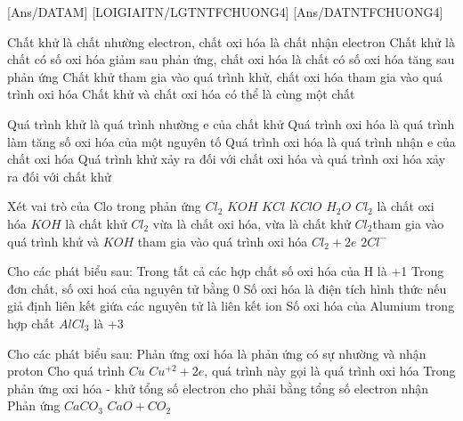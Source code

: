 [Ans/DATAM]
\luulgEXTF
{}[LOIGIAITN/LGTNTFCHUONG4]
[Ans/DATNTFCHUONG4]
\begin{ex}
	\choiceTF
	{\True Chất khử là chất nhường electron, chất oxi hóa là chất nhận electron}
	{Chất khử là chất có số oxi hóa giảm sau phản ứng, chất oxi hóa là chất có số oxi hóa tăng sau phản ứng}
	{Chất khử tham gia vào quá trình khử, chất oxi hóa tham gia vào quá trình oxi hóa}
	{\True Chất khử và chất oxi hóa có thể là cùng một chất}
	\loigiai{}
\end{ex}
\begin{ex}
	\choiceTF
	{Quá trình khử là quá trình nhường e của chất khử}
	{\True Quá trình  oxi hóa là quá trình làm tăng số oxi hóa của một nguyên tố}
	{Quá trình oxi hóa là quá trình nhận e của chất oxi hóa}
	{\True Quá trình khử xảy ra đối với chất oxi hóa và quá trình oxi hóa xảy ra đối với chất khử}
	\loigiai{}
\end{ex}
\begin{ex}Xét vai trò của Clo trong phản ứng $Cl_2$ \explus $KOH$ \MuiTen $KCl$ \explus $KClO$ \explus $H_2O$
	\choiceTF
	{ $Cl_2 $ là chất oxi hóa $KOH$ là chất khử}
	{\True $Cl_2$ vừa là chất oxi hóa, vừa là chất khử}
	{$Cl_2 $tham gia vào quá trình khử và $KOH$ tham gia vào quá trình oxi hóa}
	{\True $ Cl_2 + 2e$ \MuiTen[][][0.65]$2Cl^{-}$}
	\loigiai{}
\end{ex}
\begin{ex}
	Cho các phát biểu sau:
	\choiceTF
	{Trong tất cả các hợp chất số oxi hóa của H là +1}
	{\True Trong đơn chất, số oxi hoá của nguyên tử bằng 0}
	{\True Số oxi hóa là điện tích hình thức nếu giả định liên kết giứa các nguyên tử là liên kết ion}
	{\True Số oxi hóa của Alumium trong hợp chất $AlCl_3$ là +3}
	\loigiai{}
\end{ex}
\begin{ex}
	Cho các phát biểu sau:
	\choiceTF
	{Phản ứng oxi hóa là phản ứng có sự nhường và nhận proton}
	{\True Cho quá trình $Cu$ \MuiTen $Cu^{+2} +2e$, quá trình này gọi là quá trình oxi hóa}
	{\True Trong phản ứng oxi hóa - khử tổng số electron cho phải bằng tổng số electron nhận}
	{Phản ứng $CaCO_3$ \MuiTen[$t^{\circ}$]$CaO + CO_2$}
	\loigiai{}
\end{ex}
